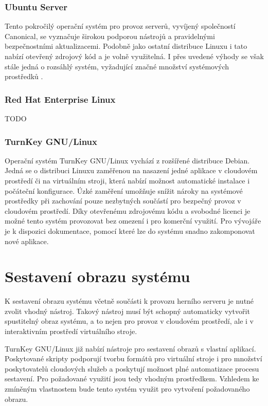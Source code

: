 \subsubsection{Ubuntu Server}

Tento pokročilý operační systém pro provoz serverů, vyvíjený společností Canonical, se vyznačuje širokou podporou nástrojů a pravidelnými bezpečnostními
aktualizacemi. Podobně jako ostatní distribuce Linuxu i tato nabízí otevřený zdrojový kód a je volně využitelná. I přes uvedené výhody se však stále jedná o
rozsáhlý systém, vyžadující značné množství systémových prostředků \cite{ubuntu_server_reqs}.

\subsubsection{Red Hat Enterprise Linux}

TODO

\subsubsection{TurnKey GNU/Linux}

Operační systém TurnKey GNU/Linux vychází z rozšířené distribuce Debian. Jedná se o distribuci Linuxu zaměřenou na nasazení jedné aplikace v cloudovém prostředí
či na virtuálním stroji, která nabízí možnost automatické instalace i počáteční konfigurace. Úzké zaměření umožňuje snížit nároky na systémové prostředky
při zachování pouze nezbytných součástí pro bezpečný provoz v cloudovém prostředí. Díky otevřenému zdrojovému kódu a svobodné licenci je možné
tento systém provozovat bez omezení i pro komerční využití. Pro vývojáře je k dispozici dokumentace, pomocí které lze do systému snadno zakomponovat
nové aplikace.

\section{Sestavení obrazu systému}

K sestavení obrazu systému včetně součásti k provozu herního serveru je nutné zvolit vhodný nástroj. Takový nástroj
musí být schopný automaticky vytvořit spustitelný obraz systému, a to nejen pro provoz v cloudovém prostředí, ale i
v interaktivním prostředí virtuálního stroje.

TurnKey GNU/Linux již nabízí nástroje pro sestavení obrazů s vlastní aplikací. Poskytované skripty podporují tvorbu formátů
pro virtuální stroje i pro množství poskytovatelů cloudových služeb a poskytují možnost plné automatizace procesu sestavení.
Pro požadované využití jsou tedy vhodným prostředkem. Vzhledem ke zmíněným vlastnostem bude tento systém využit pro vytvoření
požadovaného obrazu.

